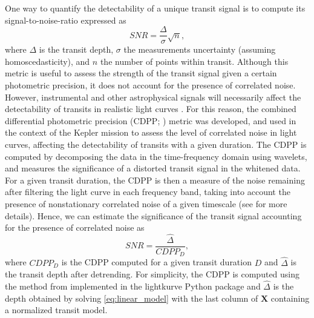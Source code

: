 \documentclass[modern]{aastex631}
\begin{document}
One way to quantify the detectability of a unique transit signal is to compute its signal-to-noise-ratio expressed as 
\begin{equation*}
  SNR= \frac{\Delta}{\sigma}\sqrt{n},
\end{equation*}
where $\Delta$ is the transit depth, $\sigma$ the measurements uncertainty (assuming homoscedasticity), and $n$ the number of points within transit. Although this metric is useful to assess the strength of the transit signal given a certain photometric precision, it does not account for the presence of correlated noise. However, instrumental and other astrophysical signals will necessarily affect the detectability of transits in realistic light curves \citep{Pont2006}. For this reason, the combined differential photometric precision (CDPP; \citealt{Jenkins2010}) metric was developed, and used in the context of the Kepler mission to assess the level of correlated noise in light curves, affecting the detectability of transits with a given duration. 
The CDPP is computed by decomposing the data in the time-frequency domain using wavelets, and measures the significance of a distorted transit signal in the whitened data. For a given transit duration, the CDPP is then a measure of the noise remaining after filtering the light curve in each frequency band, taking into account the presence of nonstationary correlated noise of a given timescale (see \citealt{Jenkins2010} for more details). Hence, we can estimate the significance of the transit signal accounting for the presence of correlated noise as
\begin{equation}\label{eq:snr}
  SNR= \frac{\hat{\Delta}}{CDPP_D},
\end{equation}
where $CDPP_D$ is the CDPP computed for a given transit duration $D$ and $\hat{\Delta}$ is the transit depth after detrending. For simplicity, the CDPP is computed using the method from \cite{Gilliland2011} implemented in the \textsf{lightkurve} Python package \citep{Lightkurve} and $\hat{\Delta}$ is the depth obtained by solving \autoref{eq:linear_model} with the last column of $\bm{X}$ containing a normalized transit model.
\end{document}
